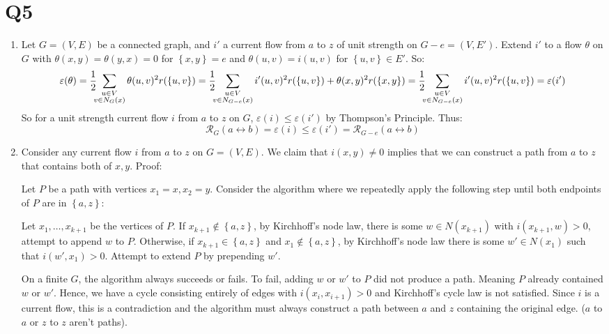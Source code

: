 \documentclass[a4paper, 11pt]{article}
\def\set#1{\left\{ #1 \right\}}
\begin{document}
\section*{Q5}
\begin{enumerate}[label=(\alph*)]
	\item
		Let $G=(V,E)$ be a connected graph, and $i'$ a current flow from $a$ to $z$ of unit strength on $G-e=(V,E')$. Extend $i'$ to a flow $\theta$ on $G$ with $\theta(x,y)=\theta(y,x)=0$ for $\set{x,y}=e$ and $\theta(u,v)=i(u,v)$ for $\set{u,v}\in E'$. So:
	      \[
		      \varepsilon(\theta)
		      =\frac12\hspace{-0.5em}\sum_{\substack{u\in V\\ v\in N_G(x)}}\theta(u,v)^2r(\set{u,v})
		      =\frac12\hspace{-0.5em}\sum_{\substack{u\in V\\ v\in N_{G-e}(x)}}i'(u,v)^2r(\set{u,v}) + \theta(x,y)^2r(\set{x,y})
		      =\frac12\hspace{-0.5em}\sum_{\substack{u\in V\\ v\in N_{G-e}(x)}}i'(u,v)^2r(\set{u,v})
			  =\varepsilon(i')
	      \]
		So for a unit strength current flow $i$ from $a$ to $z$ on $G$, $\varepsilon(i)\leq\varepsilon(i')$ by Thompson's Principle. Thus:
		$$\mathcal{R}_G(a\leftrightarrow b)=\varepsilon(i)\leq\varepsilon(i')= \mathcal{R}_{G-e}(a\leftrightarrow b)$$

	\item 
		Consider any current flow $i$ from $a$ to $z$ on $G=(V,E)$. We claim that $i(x,y)\neq0$ implies that we can construct a path from $a$ to $z$ that contains both of $x,y$. Proof:
		\begin{mdframed}
			Let $P$ be a path with vertices $x_1=x,x_2=y$. Consider the algorithm where we repeatedly apply the following step until both endpoints of $P$ are in $\set{a,z}$:
			
			Let $x_1,\dots,x_{k+1}$ be the vertices of $P$. If $x_{k+1}\notin\set{a,z}$, by Kirchhoff's node law, there is some $w\in N(x_{k+1})$ with $i(x_{k+1},w)>0$, attempt to append $w$ to $P$. Otherwise, if $x_{k+1}\in\set{a,z}$ and $x_1\notin\set{a,z}$, by Kirchhoff's node law there is some $w'\in N(x_1)$ such that $i(w',x_1)>0$. Attempt to extend $P$ by prepending $w'$.

			On a finite $G$, the algorithm always succeeds or fails. To fail, adding $w$ or $w'$ to $P$ did not produce a path. Meaning $P$ already contained $w$ or $w'$. Hence, we have a cycle consisting entirely of edges with $i(x_{i},x_{i+1})>0$ and Kirchhoff's cycle law is not satisfied. Since $i$ is a current flow, this is a contradiction and the algorithm must always construct a path between $a$ and $z$ containing the original edge. ($a$ to $a$ or $z$ to $z$ aren't paths). 
		\end{mdframed}
		\pagebreak
	   

\end{enumerate}
\end{document}
